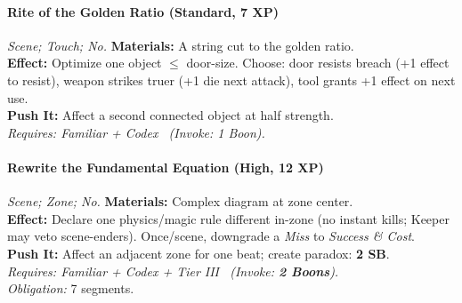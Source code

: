 \paragraph{Rite of the Golden Ratio (Standard, 7 XP)} \emph{Scene; Touch; No.}
\textbf{Materials:} A string cut to the golden ratio.\\
\textbf{Effect:} Optimize one object $\le$ door-size. Choose: door resists breach (+1 effect to resist), weapon strikes truer (+1 die next attack), tool grants +1 effect on next use.\\
\textbf{Push It:} Affect a second connected object at half strength.\\
\emph{Requires: Familiar + Codex \ (\textit{Invoke:} 1 Boon).}

\paragraph{Rewrite the Fundamental Equation (High, 12 XP)} \emph{Scene; Zone; No.}
\textbf{Materials:} Complex diagram at zone center.\\
\textbf{Effect:} Declare one physics/magic rule different in-zone (no instant kills; Keeper may veto scene-enders). Once/scene, downgrade a \emph{Miss} to \emph{Success \& Cost}.\\
\textbf{Push It:} Affect an adjacent zone for one beat; create paradox: \textbf{2 SB}.\\
\emph{Requires: Familiar + Codex + Tier III \ (\textit{Invoke:} \textbf{2 Boons}).}\\
\emph{Obligation:} 7 segments.
